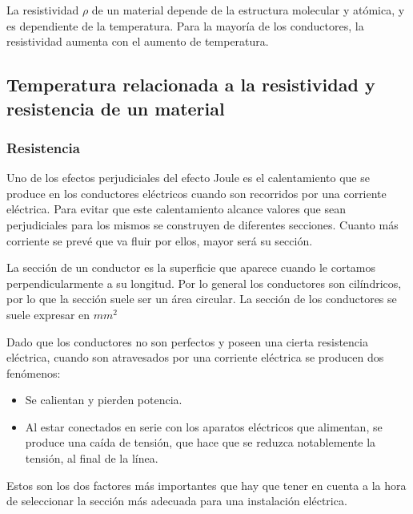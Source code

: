 \documentclass[letterpaper, 12pt]{report}
\begin{document}
La resistividad $\rho$ de un material depende de la estructura molecular y
atómica, y es dependiente de la temperatura. Para la mayoría de los
conductores, la resistividad aumenta con el aumento de temperatura.
~\cite{KhanAcademyResistividad}

\subsection{Temperatura relacionada a la resistividad y resistencia de
	un material}

\subsubsection{Resistencia}

Uno de los efectos perjudiciales del efecto Joule es el
calentamiento que se produce en los conductores eléctricos
cuando son recorridos por una corriente eléctrica. Para evitar
que este calentamiento alcance valores que sean perjudiciales
para los mismos se construyen de diferentes secciones. Cuanto
más corriente se prevé que va fluir por ellos, mayor será su sección.

\bigskip

La sección de un conductor es la superficie que aparece
cuando le cortamos perpendicularmente a su longitud. Por lo
general los conductores son cilíndricos, por lo que la sección
suele ser un área circular. La sección de los conductores
se suele expresar en $mm^2$

\bigskip

Dado que los conductores no son perfectos y poseen una
cierta resistencia eléctrica, cuando son atravesados por
una corriente eléctrica se producen dos fenómenos:

\begin{itemize}
	\item Se calientan y pierden potencia.
	\item Al estar conectados en serie con los aparatos eléctricos
	      que alimentan, se produce una caída de tensión, que
	      hace que se reduzca notablemente la tensión, al final
	      de la línea.
\end{itemize}

\bigskip

Estos son los dos factores más importantes que hay que
tener en cuenta a la hora de seleccionar la sección más adecuada para una
instalación eléctrica.
\end{document}
